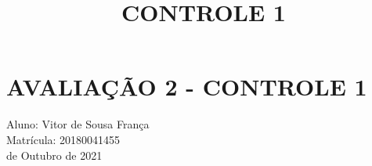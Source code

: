 \documentclass{article}
\title{CONTROLE 1}
\begin{document}
\section*{AVALIAÇÃO 2 - CONTROLE 1}

\indent Aluno: Vitor de Sousa França\\
\indent Matrícula: 20180041455\\
 de Outubro de 2021\\



\end{document}
